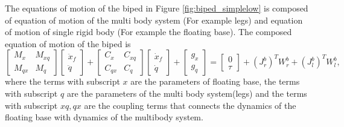 The equations of motion of the biped in Figure \ref{fig:biped_simplelow} is composed of equation of motion of the multi body system (For example legs) and equation of motion of single rigid body (For example the floating base). The composed equation of motion of the biped is \cite{ott09} 
\begin{equation} \label{eq:dyn_biped}
\begin{bmatrix}
M_x &M_{xq} \\ M_{qx} &M_q
\end{bmatrix}
\begin{bmatrix}
\ddot{x}_f \\ \ddot{q}
\end{bmatrix}
+
\begin{bmatrix}
C_x &C_{xq} \\ C_{qx} &C_q
\end{bmatrix}
\begin{bmatrix}
\dot{x}_f \\ \dot{q}
\end{bmatrix}
+
\begin{bmatrix}
g_x \\ g_q
\end{bmatrix}
=
\begin{bmatrix}
0 \\ \tau
\end{bmatrix}
+ (J_r^b)^T W_r^b + (J_l^b)^T W_l^b,
\end{equation}
where the terms with subscript $x$ are the parameters of floating  base, the terms with subscript $q$ are the parameters of the multi body system(legs) and the terms with subscript $xq, qx$ are the coupling terms that connects the dynamics of the floating base with dynamics of the multibody system.

